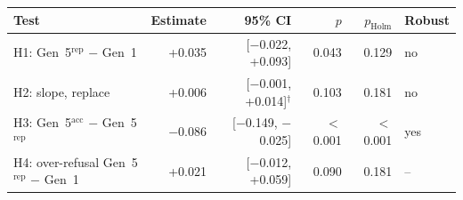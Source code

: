 \begin{tabular}{lrrrrl}
\toprule
Test & Estimate & 95\% CI & $p$ & $p_{\mathrm{Holm}}$ & Robust \\
\midrule
H1: Gen~5$^{\mathrm{rep}}$ $-$ Gen~1 & +0.035 & [$-$0.022, +0.093] & 0.043 & 0.129 & no \\
H2: slope, replace & +0.006 & [$-$0.001, +0.014]$^{\dagger}$ & 0.103 & 0.181 & no \\
H3: Gen~5$^{\mathrm{acc}}$ $-$ Gen~5$^{\mathrm{rep}}$ & $-$0.086 & [$-$0.149, $-$0.025] & $<$0.001 & $<$0.001 & yes \\
H4: over-refusal Gen~5$^{\mathrm{rep}}$ $-$ Gen~1 & +0.021 & [$-$0.012, +0.059] & 0.090 & 0.181 & -- \\
\bottomrule
\end{tabular}
